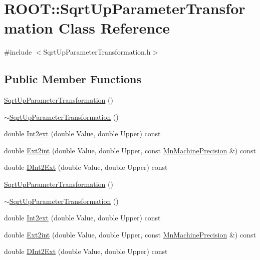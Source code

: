 \hypertarget{classROOT_1_1Minuit2_1_1SqrtUpParameterTransformation}{}\section{R\+O\+OT\+:\+:Sqrt\+Up\+Parameter\+Transformation Class Reference}
\label{classROOT_1_1Minuit2_1_1SqrtUpParameterTransformation}


{\ttfamily \#include $<$Sqrt\+Up\+Parameter\+Transformation.\+h$>$}

\subsection*{Public Member Functions}
\begin{DoxyCompactItemize}
\item 
\mbox{\hyperlink{classROOT_1_1Minuit2_1_1SqrtUpParameterTransformation_a80ef735d8397fb4b24b6c31b422efa29}{Sqrt\+Up\+Parameter\+Transformation}} ()
\item 
\mbox{\hyperlink{classROOT_1_1Minuit2_1_1SqrtUpParameterTransformation_aca319b673b2b9abd5493c318dcb4c6d2}{$\sim$\+Sqrt\+Up\+Parameter\+Transformation}} ()
\item 
double \mbox{\hyperlink{classROOT_1_1Minuit2_1_1SqrtUpParameterTransformation_afd65e37e7e03cb9db5bf9906eb399fc8}{Int2ext}} (double Value, double Upper) const
\item 
double \mbox{\hyperlink{classROOT_1_1Minuit2_1_1SqrtUpParameterTransformation_a8ba129e1707b752df2b477c5e8459958}{Ext2int}} (double Value, double Upper, const \mbox{\hyperlink{classROOT_1_1Minuit2_1_1MnMachinePrecision}{Mn\+Machine\+Precision}} \&) const
\item 
double \mbox{\hyperlink{classROOT_1_1Minuit2_1_1SqrtUpParameterTransformation_a82e3860242c4f0d7a81dabef95803bd1}{D\+Int2\+Ext}} (double Value, double Upper) const
\item 
\mbox{\hyperlink{classROOT_1_1Minuit2_1_1SqrtUpParameterTransformation_a80ef735d8397fb4b24b6c31b422efa29}{Sqrt\+Up\+Parameter\+Transformation}} ()
\item 
\mbox{\hyperlink{classROOT_1_1Minuit2_1_1SqrtUpParameterTransformation_aca319b673b2b9abd5493c318dcb4c6d2}{$\sim$\+Sqrt\+Up\+Parameter\+Transformation}} ()
\item 
double \mbox{\hyperlink{classROOT_1_1Minuit2_1_1SqrtUpParameterTransformation_afd65e37e7e03cb9db5bf9906eb399fc8}{Int2ext}} (double Value, double Upper) const
\item 
double \mbox{\hyperlink{classROOT_1_1Minuit2_1_1SqrtUpParameterTransformation_a8ba129e1707b752df2b477c5e8459958}{Ext2int}} (double Value, double Upper, const \mbox{\hyperlink{classROOT_1_1Minuit2_1_1MnMachinePrecision}{Mn\+Machine\+Precision}} \&) const
\item 
double \mbox{\hyperlink{classROOT_1_1Minuit2_1_1SqrtUpParameterTransformation_a82e3860242c4f0d7a81dabef95803bd1}{D\+Int2\+Ext}} (double Value, double Upper) const
\end{DoxyCompactItemize}


